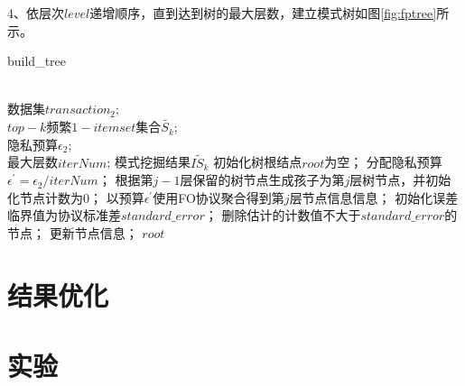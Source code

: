 \documentclass[UTF8]{ctexart}
\begin{document}
4、依层次$level$递增顺序，直到达到树的最大层数，建立模式树如图\ref{fig:fptree}所示。

\begin{algorithm}[ht]
\caption{build\_tree}
\label{alg:bulid tree}
\begin{algorithmic}[1]
\REQUIRE ~~\\
数据集$transaction_2$;\\
$top-k$频繁$1-itemset$集合$\tilde{S_k}$;\\
隐私预算$\epsilon_2$;\\
最大层数$iterNum$;
\ENSURE 模式挖掘结果$\tilde{IS_k}$
\STATE 初始化树根结点$root$为空；
    \STATE 分配隐私预算$\epsilon^{\prime} = \epsilon_2 / iterNum$；
    \STATE 根据第$j-1$层保留的树节点生成孩子为第$j$层树节点，并初始化节点计数为0；
    \STATE 以预算$\epsilon^{\prime}$使用FO协议聚合得到第$j$层节点信息信息；
    \STATE 初始化误差临界值为协议标准差$standard\_error$；
    \STATE 删除估计的计数值不大于$standard\_error$的节点；
    \STATE 更新节点信息；
\ENDFOR
\RETURN $root$
\end{algorithmic}
\end{algorithm}


\section{结果优化}
\label{section:optimize}

\section{实验}
\end{document}
